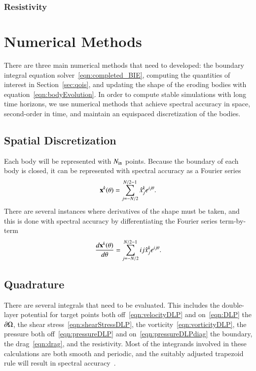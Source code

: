 \documentclass[preprint, 10pt]{elsarticle}
\begin{document}
\subsubsection{Resistivity}



\section{Numerical Methods\label{s:method}} 
There are three main numerical methods that need to developed: the
boundary integral equation solver~\eqref{eqn:completed_BIE}, computing
the quantities of interest in Section~\ref{sec:qois}, and updating the
shape of the eroding bodies with equation~\eqref{eqn:bodyEvolution}.  In
order to compute stable simulations with long time horizons, we use
numerical methods that achieve spectral accuracy in space, second-order
in time, and maintain an equispaced discretization of the bodies.


\subsection{Spatial Discretization}
Each body will be represented with $N_{\mathrm{in}}$ points.  Because
the boundary of each body is closed, it can be represented with spectral
accuracy as a Fourier series
\begin{align*}
  {\mathbf{x}}^k(\theta) = \sum_{j = -N/2}^{N/2-1} \hat{x}_j^k e^{ij\theta}.
\end{align*}
There are several instances where derivatives of the shape must be
taken, and this is done with spectral accuracy by differentiating the
Fourier series term-by-term
\begin{align*}
  \frac{d{\mathbf{x}}^k(\theta)}{d\theta} = 
      \sum_{j = -N/2}^{N/2-1} ij\hat{x}_j^k e^{ij\theta}.
\end{align*}


\subsection{Quadrature} 
There are several integrals that need to be evaluated.  This includes
the double-layer potential for target points both
off~\eqref{eqn:velocityDLP} and on~\eqref{eqn:DLP} the ${\partial}\Omega$, the
shear stress~\eqref{eqn:shearStressDLP}, the
vorticity~\eqref{eqn:vorticityDLP}, the pressure both
off~\eqref{eqn:pressureDLP} and on~\eqref{eqn:pressureDLPdiag} the
boundary, the drag~\eqref{eqn:drag}, and the resistivity.  Most of the
integrands involved in these calculations are both smooth and periodic,
and the suitably adjusted trapezoid rule will result in spectral
accuracy~\cite{tre-wei2014}.
\end{document}
